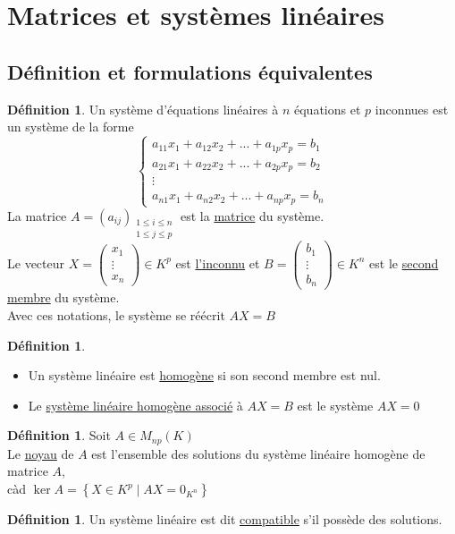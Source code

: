 \documentclass[10pt,a4paper]{article}
\theoremstyle{definition}
\newtheorem{definition}[proposition]{Définition}
\begin{document}
\section{Matrices et systèmes linéaires}
\subsection{Définition et formulations équivalentes}
\begin{definition}
Un système d'équations linéaires à $n$ équations et $p$ inconnues est un système de la forme
\[ \begin{cases}
a_{11}x_1 + a_{12}x_2 + ... + a_{1p}x_p = b_1 \\
a_{21}x_1 + a_{22}x_2 + ... + a_{2p}x_p = b_2 \\
\vdots \\
a_{n1}x_1 + a_{n2}x_2 + ... + a_{np}x_p = b_n
\end{cases} \]
La matrice $A = \left(a_{ij}\right)_{\substack{1 \leq i \leq n \\ 1 \leq j \leq p}}$ est la \uline{matrice} du système. \\
Le vecteur $X = \begin{pmatrix}
x_1 \\ \vdots \\ x_n
\end{pmatrix} \in K^p$ est \uline{l'inconnu} et $B = \begin{pmatrix}
b_1 \\ \vdots \\ b_n
\end{pmatrix} \in K^n$ est le \uline{second membre} du système. \\
Avec ces notations, le système se réécrit $AX = B$
\end{definition}
\begin{definition}
\hfill
\begin{itemize}
\item Un système linéaire est \uline{homogène} si son second membre est nul.
\item Le \uline{système linéaire homogène associé} à $AX = B$ est le système $AX = 0$
\end{itemize}
\end{definition}
\begin{definition}
Soit $A \in M_{np}(K)$ \\
Le \uline{noyau} de $A$ est l'ensemble des solutions du système linéaire homogène de matrice $A$, \\
càd $\ker A = \left\{ X \in K^p \mid AX = 0_{K^n} \right\}$
\end{definition}
\begin{definition}
Un système linéaire est dit \uline{compatible} s'il possède des solutions.
\end{definition}
\end{document}
